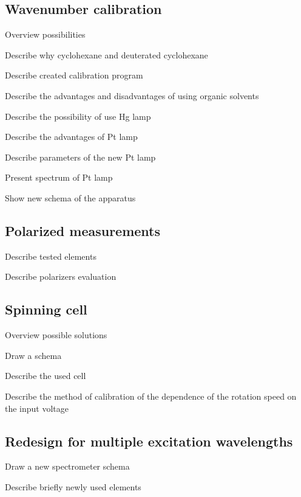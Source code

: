 


\subsection{Wavenumber calibration}
\begin{docitemize}
	\item Overview possibilities
	\item Describe why cyclohexane and deuterated cyclohexane
	\item Describe created calibration program
	\item Describe the advantages and disadvantages of using organic solvents
	\item Describe the possibility of use Hg lamp
	\item Describe the advantages of Pt lamp
	\item Describe parameters of the new Pt lamp
	\item Present spectrum of Pt lamp
	\item Show new schema of the apparatus
\end{docitemize}


\subsection{Polarized measurements}
\begin{docitemize}
	\item Describe tested elements
	\item Describe polarizers evaluation
\end{docitemize}


\subsection{Spinning cell}
\begin{docitemize}
	\item Overview possible solutions
	\item Draw a schema
	\item Describe the used cell
	\item Describe the method of calibration of the dependence of the rotation
	speed on the input voltage
\end{docitemize}


\subsection{Redesign for multiple excitation wavelengths}
\begin{docitemize}
	\item Draw a new spectrometer schema
	\item Describe briefly newly used elements
\end{docitemize}


